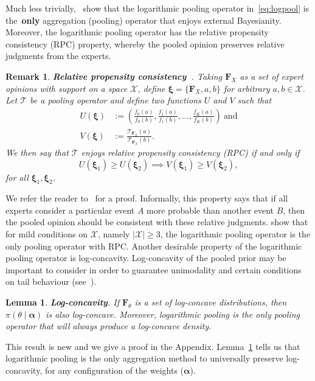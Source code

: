 \documentclass[a4paper, notitlepage, 10pt]{article}
\newtheorem{remark}{Remark}[]
\newtheorem{lemma}{Lemma}[]
\begin{document}
Much less trivially,~\cite{Genest1984} show that the logarithmic pooling operator in~\ref{eq:logpool} is the~\textbf{only} aggregation (pooling) operator that enjoys external Bayesianity.
Moreover, the logarithmic pooling operator has the relative propensity consistency (RPC) property, whereby the pooled opinion preserves relative judgments from the experts.
\begin{remark}
\label{rmk:properties_RPC}
\textbf{Relative propensity consistency~\citep{Genest1984}}.
Taking $\boldsymbol F_{X}$ as a set of expert opinions with support on a space $\mathcal{X}$, define $\boldsymbol \xi = \{\boldsymbol F_{X}, a, b\}$ for arbitrary $a , b \in \mathcal{X}$.
Let $\mathcal{T}$ be a pooling operator and define two functions $U$ and $V$ such that 
\begin{align}
 U(\boldsymbol \xi) &:= \left( \frac{f_0(a)}{f_0(b)}, \frac{f_1(a)}{f_1(b)}, \ldots, \frac{f_K(a)}{f_K(b)} \right)\:\text{and}\\
 V(\boldsymbol \xi) & := \frac{\mathcal{T}_{\boldsymbol F_{X}} (a)}{\mathcal{T}_{\boldsymbol F_{X}} (b)}.
\end{align}
We then say that $\mathcal{T}$ enjoys \textit{relative propensity consistency} (RPC) if and only if
\begin{equation}
 U(\boldsymbol \xi_1) \geq U(\boldsymbol \xi_2) \implies  V(\boldsymbol \xi_1) \geq V(\boldsymbol \xi_2),
\end{equation}
for all $\boldsymbol \xi_1, \boldsymbol \xi_2$.
\end{remark}
We refer the reader to~\cite{Genest1984} for a proof.
Informally, this property says that if all experts consider a particular event $A$ more probable than another event $B$, then the pooled opinion should be consistent with these relative judgments. 
\cite{Genest1984} show that for mild conditions on $\mathcal{X}$, namely $|\mathcal{X}| \geq 3$, the logarithmic pooling operator is the only pooling operator with RPC.
Another desirable property of the logarithmic pooling operator is log-concavity.
Log-concavity of the pooled prior may be important to consider in order to guarantee unimodality and certain conditions on tail behaviour (see~\cite{Bagnoli2005}).
\begin{lemma}
\label{lem:concavity}
\textbf{Log-concavity}. 
If $\mathbf{F}_{\theta}$ is a set of log-concave distributions, then $\pi(\theta\mid \boldsymbol \alpha)$ is also log-concave.
Moreover, logarithmic pooling is the only pooling operator that will always produce a log-concave density.
\end{lemma}
This result is new and we give a proof in the Appendix.
Lemma~\ref{lem:concavity} tells us that logarithmic pooling is the only aggregation method to universally preserve log-concavity, for any configuration of the weights ($\boldsymbol{\alpha}$).
\end{document}
